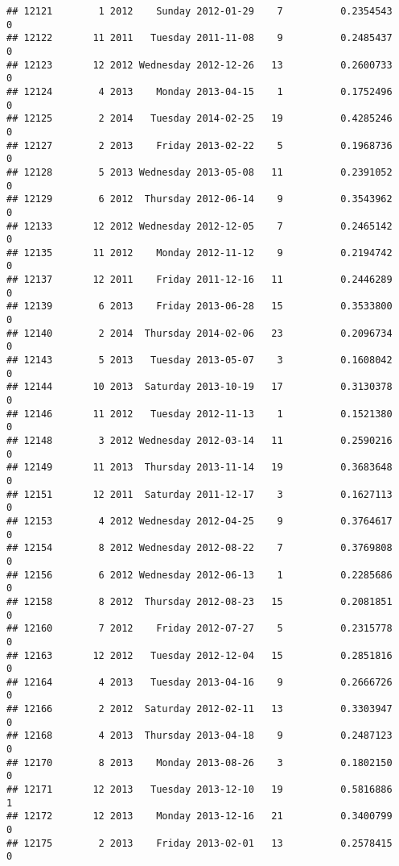 \documentclass[
]{article}
\begin{document}
\begin{verbatim}
## 12121        1 2012    Sunday 2012-01-29    7          0.2354543             0
## 12122       11 2011   Tuesday 2011-11-08    9          0.2485437             0
## 12123       12 2012 Wednesday 2012-12-26   13          0.2600733             0
## 12124        4 2013    Monday 2013-04-15    1          0.1752496             0
## 12125        2 2014   Tuesday 2014-02-25   19          0.4285246             0
## 12127        2 2013    Friday 2013-02-22    5          0.1968736             0
## 12128        5 2013 Wednesday 2013-05-08   11          0.2391052             0
## 12129        6 2012  Thursday 2012-06-14    9          0.3543962             0
## 12133       12 2012 Wednesday 2012-12-05    7          0.2465142             0
## 12135       11 2012    Monday 2012-11-12    9          0.2194742             0
## 12137       12 2011    Friday 2011-12-16   11          0.2446289             0
## 12139        6 2013    Friday 2013-06-28   15          0.3533800             0
## 12140        2 2014  Thursday 2014-02-06   23          0.2096734             0
## 12143        5 2013   Tuesday 2013-05-07    3          0.1608042             0
## 12144       10 2013  Saturday 2013-10-19   17          0.3130378             0
## 12146       11 2012   Tuesday 2012-11-13    1          0.1521380             0
## 12148        3 2012 Wednesday 2012-03-14   11          0.2590216             0
## 12149       11 2013  Thursday 2013-11-14   19          0.3683648             0
## 12151       12 2011  Saturday 2011-12-17    3          0.1627113             0
## 12153        4 2012 Wednesday 2012-04-25    9          0.3764617             0
## 12154        8 2012 Wednesday 2012-08-22    7          0.3769808             0
## 12156        6 2012 Wednesday 2012-06-13    1          0.2285686             0
## 12158        8 2012  Thursday 2012-08-23   15          0.2081851             0
## 12160        7 2012    Friday 2012-07-27    5          0.2315778             0
## 12163       12 2012   Tuesday 2012-12-04   15          0.2851816             0
## 12164        4 2013   Tuesday 2013-04-16    9          0.2666726             0
## 12166        2 2012  Saturday 2012-02-11   13          0.3303947             0
## 12168        4 2013  Thursday 2013-04-18    9          0.2487123             0
## 12170        8 2013    Monday 2013-08-26    3          0.1802150             0
## 12171       12 2013   Tuesday 2013-12-10   19          0.5816886             1
## 12172       12 2013    Monday 2013-12-16   21          0.3400799             0
## 12175        2 2013    Friday 2013-02-01   13          0.2578415             0

\end{verbatim}
\end{document}
